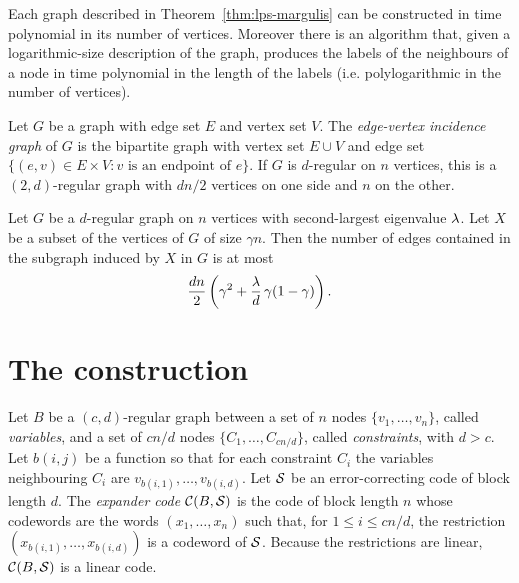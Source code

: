 \begin{proposition}
  \label{prop:lps-construct}
  \notready
  Each graph described in Theorem~\ref{thm:lps-margulis} can be constructed in
  time polynomial in its number of vertices. Moreover there is an algorithm
  that, given a logarithmic-size description of the graph, produces the labels
  of the neighbours of a node in time polynomial in the length of the labels
  (i.e. polylogarithmic in the number of vertices).
\end{proposition}

\begin{definition}
  \label{def:edge-vertex}
  Let $G$ be a graph with edge set $E$ and vertex set $V$. The
  \emph{edge-vertex incidence graph} of $G$ is the bipartite graph with vertex
  set $E \cup V$ and edge set $\{(e,v) \in E\times V : v \text{ is an endpoint
  of } e\}$. If $G$ is $d$-regular on $n$ vertices, this is a $(2,d)$-regular
  graph with $dn/2$ vertices on one side and $n$ on the other.
\end{definition}

\begin{lemma}
  \label{lem:alon-chung}
  \notready
  Let $G$ be a $d$-regular graph on $n$ vertices with second-largest eigenvalue
  $\lambda$. Let $X$ be a subset of the vertices of $G$ of size $\gamma n$. Then
  the number of edges contained in the subgraph induced by $X$ in $G$ is at most
  \[
    \frac{dn}{2}\left(\gamma^2 + \frac{\lambda}{d}\,\gamma(1-\gamma)\right).
  \]
\end{lemma}

\chapter{The construction}


\begin{definition}
  \label{def:expander-code}
  Let $B$ be a $(c,d)$-regular graph between a set of $n$ nodes
  $\{v_1,\dots,v_n\}$, called \emph{variables}, and a set of $cn/d$ nodes
  $\{C_1,\dots,C_{cn/d}\}$, called \emph{constraints}, with $d>c$. Let
  $b(i,j)$ be a function so that for each constraint $C_i$ the variables
  neighbouring $C_i$ are $v_{b(i,1)},\dots,v_{b(i,d)}$. Let $\mathcal{S}$ be an
  error-correcting code of block length $d$. The \emph{expander code}
  $\mathcal{C}(B,\mathcal{S})$ is the code of block length $n$ whose codewords are the words
  $(x_1,\dots,x_n)$ such that, for $1 \le i \le cn/d$, the restriction
  $(x_{b(i,1)},\dots,x_{b(i,d)})$ is a codeword of $\mathcal{S}$. Because the
  restrictions are linear, $\mathcal{C}(B,\mathcal{S})$ is a linear code.
\end{definition}

